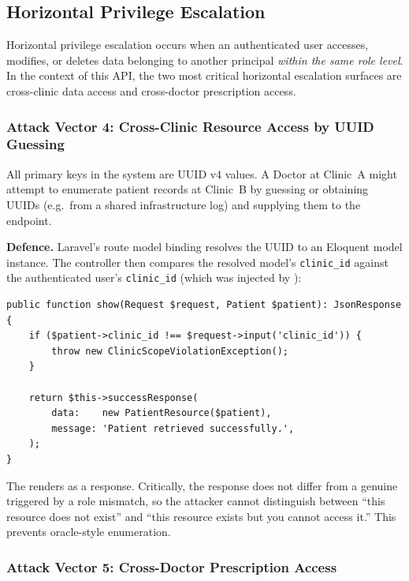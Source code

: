 \subsection{Horizontal Privilege Escalation}

Horizontal privilege escalation occurs when an authenticated user
accesses, modifies, or deletes data belonging to another principal
\emph{within the same role level}. In the context of this API, the two
most critical horizontal escalation surfaces are cross-clinic data access
and cross-doctor prescription access.

\subsubsection{Attack Vector 4: Cross-Clinic Resource Access by UUID Guessing}

All primary keys in the system are UUID v4 values. A Doctor at Clinic~A
might attempt to enumerate patient records at Clinic~B by guessing or
obtaining UUIDs (e.g.\ from a shared infrastructure log) and supplying
them to the  endpoint.

\textbf{Defence.} Laravel's route model binding resolves the UUID to an
Eloquent model instance. The controller then compares the resolved model's
\texttt{clinic\_id} against the authenticated user's \texttt{clinic\_id}
(which was injected by ):

\begin{lstlisting}[style=php, caption={Cross-clinic ownership check in a
  Doctor route controller.}]
public function show(Request $request, Patient $patient): JsonResponse
{
    if ($patient->clinic_id !== $request->input('clinic_id')) {
        throw new ClinicScopeViolationException();
    }

    return $this->successResponse(
        data:    new PatientResource($patient),
        message: 'Patient retrieved successfully.',
    );
}
\end{lstlisting}

The  renders as a \stforbid{}
response. Critically, the response does not differ from a genuine
\stforbid{} triggered by a role mismatch, so the attacker cannot
distinguish between ``this resource does not exist'' and ``this resource
exists but you cannot access it.'' This prevents oracle-style
enumeration.

\subsubsection{Attack Vector 5: Cross-Doctor Prescription Access}

